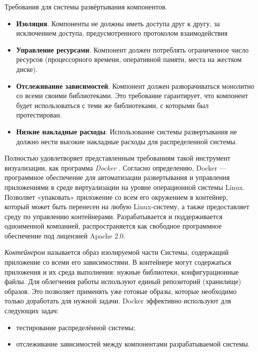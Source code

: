 Требования для системы развёртывания компонентов.
\begin{itemize}
	\item \textbf{Изоляция}. Компоненты не  должны  иметь  доступа друг к другу, за исключением доступа, предусмотренного протоколом взаимодействия
	
	\item \textbf{Управление  ресурсами}. Компонент должен  потреблять  ограниченное  число  ресурсов  (процессорного  времени, оперативной памяти, места на жестком диске).
	
	\item \textbf{Отслеживание  зависимостей}.  Компонент  должен разворачиваться  монолитно  со  всеми  своими  библиотеками.  Это требование гарантирует, что компонент будет использоваться с теми же библиотеками, с которыми был протестирован.
	
	\item \textbf{Низкие накладные расходы}. Использование системы  развертывания не должно нести высокие накладные расходы для распределенной системы.
\end{itemize}

Полностью  удовлетворяет представленным требованиям такой инструмент  визуализации,  как  программа  \textit{Docker} \cite{bib:docker}.  Согласно определению,  Docker  —  программное  обеспечение  для  автоматизации развертывания и управления приложениями в среде виртуализации на уровне операционной системы Linux. Позволяет «упаковать» приложение со всем его окружением в контейнер, который может быть перенесен на любую Linux-систему, а также предоставляет  среду  по  управлению  контейнерами.  Разрабатывается  и  поддерживается одноименной компанией, распространяется как свободное программное обеспечение под лицензией Apache 2.0.

\textit{Контейнером}  называется  образ  изолируемой  части  Системы, содержащий приложение со всеми его зависимостями. В контейнере могут содержаться приложения и их среда выполнения: нужные библиотеки, конфигурационные файлы. Для облегчения работы используют единый репозиторий (хранилище) образов. Это позволяет применять уже готовые образы, которые необходимо только доработать для нужной задачи. Docker  эффективно используют для следующих задач:
\begin{itemize}
	\item тестирование распределённой системы;
	
	\item отслеживание зависимостей между компонентами разрабатываемой системы.
\end{itemize}

